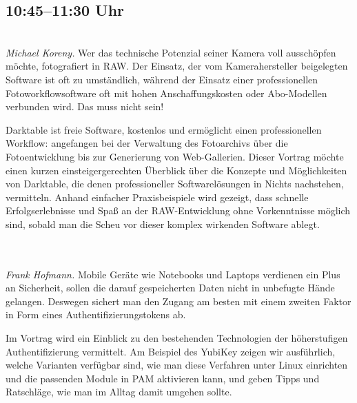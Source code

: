 \documentclass[10pt,a4paper,ngerman]{scrartcl}
\let\origdescription\description
\renewenvironment{description}{
  \setlength{\leftmargini}{0em}
  \origdescription
  \setlength{\itemindent}{0em}
  \setlength{\itemsep}{1.2em}
  \setlength{\labelsep}{\textwidth}
}
{\endlist}
\newcommand{\vorschub}{\mbox{}\\[-0.5em]}
\begin{document}
\newpage

\setlength{\columnsep}{10.5mm}

\begin{multicols}{2}

\section{10:45--11:30 Uhr}

\begin{description}
\item[Fotobearbeitung und -verwaltung mit Darktable]\vorschub
\textsl{Michael Koreny.}
Wer das technische Potenzial seiner Kamera voll ausschöpfen möchte, fotografiert in RAW. Der Einsatz, der vom Kamerahersteller beigelegten Software ist oft zu umständlich, während der Einsatz einer professionellen Fotoworkflowsoftware oft mit hohen Anschaffungskosten oder Abo-Modellen verbunden wird. Das muss nicht sein!

Darktable ist freie Software, kostenlos und ermöglicht einen professionellen Workflow: angefangen bei der Verwaltung des Fotoarchivs über die Fotoentwicklung bis zur Generierung von Web-Gallerien. Dieser Vortrag möchte einen kurzen einsteigergerechten Überblick über die Konzepte und Möglichkeiten von Darktable, die denen professioneller Softwarelösungen in Nichts nachstehen, vermitteln. Anhand einfacher Praxisbeispiele wird gezeigt, dass schnelle Erfolgserlebnisse und Spaß an der RAW-Entwicklung ohne Vorkenntnisse möglich sind, sobald man die Scheu vor dieser komplex wirkenden Software ablegt.



\item[{\parbox[t]{\linewidth}{YubiKey. Praktikable Zwei-Faktor-Authentifizierung für Linux und mobile Geräte}}]\vorschub\\
\textsl{Frank Hofmann.}
Mobile Geräte wie Notebooks und Laptops verdienen ein Plus an Sicherheit, sollen die darauf gespeicherten Daten nicht in unbefugte Hände gelangen. Deswegen sichert man den Zugang am besten mit einem zweiten Faktor in Form eines Authentifizierungstokens ab.

Im Vortrag wird ein Einblick zu den bestehenden Technologien der höherstufigen Authentifizierung vermittelt. Am Beispiel des YubiKey zeigen wir ausführlich, welche Varianten verfügbar sind, wie man diese Verfahren unter Linux einrichten und die passenden Module in PAM aktivieren kann, und geben Tipps und Ratschläge, wie man im Alltag damit umgehen sollte.





\end{description}
\end{multicols}
\end{document}
